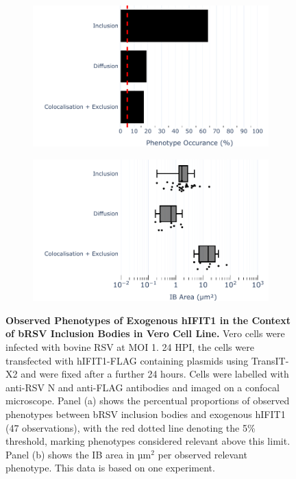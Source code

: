\begin{figure}
    \begin{subfigure}{0.495\textwidth}
        \caption{}
        \includegraphics[width=1\linewidth]{09. Chapter 4/Figs/02. Overexpression/01. IFIT1/04. bar_i1_brsv.pdf} 
    \end{subfigure}
    \begin{subfigure}{0.495\textwidth}
        \caption{}
        \includegraphics[width=1\linewidth]{09. Chapter 4/Figs/02. Overexpression/01. IFIT1/05. box_i1_brsv.pdf}
    \end{subfigure}
    \caption[Observed Phenotypes of Exogenous hIFIT1 in the Context of bRSV Inclusion Bodies in Vero Cell Line.]{\textbf{Observed Phenotypes of Exogenous hIFIT1 in the Context of bRSV Inclusion Bodies in Vero Cell Line.} Vero cells were infected with bovine RSV at MOI 1. 24 HPI, the cells were transfected with hIFIT1-FLAG containing plasmids using TransIT-X2 and were fixed after a further 24 hours. Cells were labelled with anti-RSV N and anti-FLAG antibodies and imaged on a confocal microscope. Panel (a) shows the percentual proportions of observed phenotypes between bRSV inclusion bodies and exogenous hIFIT1 (47 observations), with the red dotted line denoting the 5\% threshold, marking phenotypes considered relevant above this limit. Panel (b) shows the IB area in \(\mbox{µm}^2\) per observed relevant phenotype. This data is based on one experiment.}
    \label{fig:Observed Phenotypes of Exogenous hIFIT1 in the Context of bRSV Inclusion Bodies in VERO Cell Line}
\end{figure}

